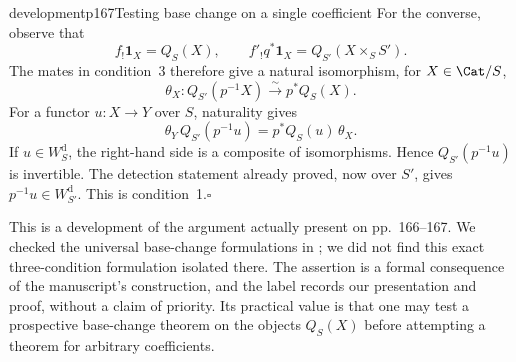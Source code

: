 \begin{dcomment}{development}{p167}{Testing base change on a single coefficient}
For the converse, observe that
\[
 f_!\mathbf1_X=Q_S(X),\qquad
 f'_!q^*\mathbf1_X=Q_{S'}(X\times_S S').
\]
The mates in condition~3 therefore give a natural isomorphism, for $X\in\Cat/S$,
\[
 \theta_X:Q_{S'}(p^{-1}X)\xrightarrow{\sim}p^*Q_S(X).
\]
For a functor $u:X\to Y$ over $S$, naturality gives
\[
 \theta_Y\,Q_{S'}(p^{-1}u)=p^*Q_S(u)\,\theta_X.
\]
If $u\in W_S^{\mathrm d}$, the right-hand side is a composite of isomorphisms. Hence $Q_{S'}(p^{-1}u)$ is invertible. The detection statement already proved, now over $S'$, gives $p^{-1}u\in W_{S'}^{\mathrm d}$. This is condition~1.\hfill$\square$

This is a development of the argument actually present on pp.~166--167. We checked the universal base-change formulations in \citet[Theorem~1.2 and \S5]{Maltsiniotis2005Asphericite}; we did not find this exact three-condition formulation isolated there. The assertion is a formal consequence of the manuscript's construction, and the label records our presentation and proof, without a claim of priority. Its practical value is that one may test a prospective base-change theorem on the objects $Q_S(X)$ before attempting a theorem for arbitrary coefficients.
\end{dcomment}

